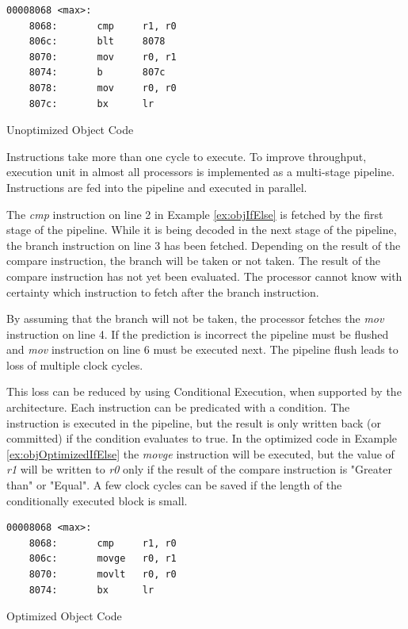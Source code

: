 \begin{Example}[h]
\begin{lstlisting}
00008068 <max>:
    8068:       cmp     r1, r0
    806c:       blt     8078   
    8070:       mov     r0, r1
    8074:       b       807c
    8078:       mov     r0, r0
    807c:       bx      lr
\end{lstlisting}
\caption{Unoptimized Object Code}
\label{ex:objIfElse}
\end{Example}

Instructions take more than one cycle to execute. To improve throughput, execution unit in almost all processors is implemented as a multi-stage pipeline. Instructions are fed into the pipeline and executed in parallel.

The \emph{cmp} instruction on line 2 in Example \ref{ex:objIfElse} is fetched by the first stage of the pipeline. While it is being decoded in the next stage of the pipeline, the branch instruction on line 3 has been fetched. Depending on the result of the compare instruction, the branch will be taken or not taken. The result of the compare instruction has not yet been evaluated. The processor cannot know with certainty which instruction to fetch after the branch instruction.

By assuming that the branch will not be taken, the processor fetches the \emph{mov} instruction on line 4. If the prediction is incorrect the pipeline must be flushed and \emph{mov} instruction on line 6 must be executed next. The pipeline flush leads to loss of multiple clock cycles.

This loss can be reduced by using Conditional Execution, when supported by the architecture. Each instruction can be predicated with a condition. The instruction is executed in the pipeline, but the result is only written back (or committed) if the condition evaluates to true. In the optimized code in Example \ref{ex:objOptimizedIfElse} the \emph{movge} instruction will be executed, but the value of \emph{r1} will be written to \emph{r0} only if the result of the compare instruction is "Greater than" or "Equal". A few clock cycles can be saved if the length of the conditionally executed block is small.

\begin{Example}[h]
\begin{lstlisting}
00008068 <max>:
    8068:       cmp     r1, r0
    806c:       movge   r0, r1
    8070:       movlt   r0, r0
    8074:       bx      lr
\end{lstlisting}
\caption{Optimized Object Code}
\label{ex:objOptimizedIfElse}
\end{Example}

